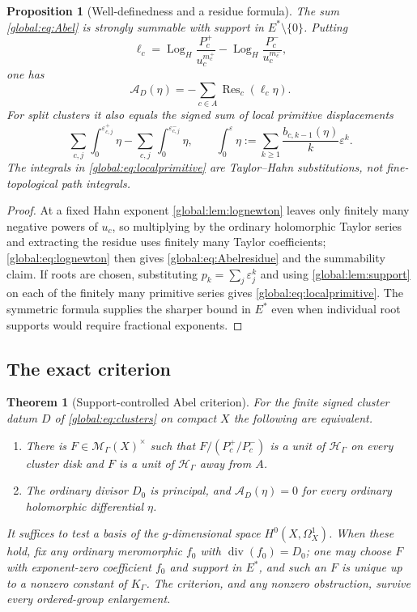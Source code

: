 \documentclass[11pt,letterpaper]{article}
\newtheorem{theorem}{Theorem}[section]
\newtheorem{proposition}[proposition]{Proposition}
\theoremstyle{definition}
\theoremstyle{remark}
\newcommand{\HH}{\mathscr H_\Gamma}
\newcommand{\KK}{K_\Gamma}
\newcommand{\LogH}{\operatorname{Log}_{H}}
\newcommand{\MG}{\mathscr M_\Gamma}
\newcommand{\Res}{\operatorname{Res}}
\numberwithin{equation}{section}
\begin{document}
\begin{proposition}[Well-definedness and a residue formula]\label{global:prop:abelresidue}
The sum \eqref{global:eq:Abel} is strongly summable with support in $E^*\setminus\{0\}$. Putting
\[
  \ell_c=\LogH\frac{P_c^+}{u_c^{m_c^+}}-\LogH\frac{P_c^-}{u_c^{m_c^-}},
\]
one has
\begin{equation}\label{global:eq:Abelresidue}
  \mathcal A_D(\eta)=-\sum_{c\in A}\Res_c(\ell_c\eta).
\end{equation}
For split clusters it also equals the signed sum of local primitive displacements
\begin{equation}\label{global:eq:localprimitive}
  \sum_{c,j}\int_0^{\varepsilon^+_{c,j}}\eta-\sum_{c,j}\int_0^{\varepsilon^-_{c,j}}\eta,
  \qquad
  \int_0^\varepsilon\eta:=\sum_{k\ge1}\frac{b_{c,k-1}(\eta)}{k}\varepsilon^k .
\end{equation}
\emph{The integrals in \eqref{global:eq:localprimitive} are Taylor--Hahn substitutions, not fine-topological path integrals.}
\end{proposition}

\begin{proof}
At a fixed Hahn exponent \cref{global:lem:lognewton} leaves only finitely many negative powers of $u_c$, so multiplying by the ordinary holomorphic Taylor series and extracting the residue uses finitely many Taylor coefficients; \eqref{global:eq:lognewton} then gives \eqref{global:eq:Abelresidue} and the summability claim. If roots are chosen, substituting $p_k=\sum_j\varepsilon_j^k$ and using \cref{global:lem:support} on each of the finitely many primitive series gives \eqref{global:eq:localprimitive}. The symmetric formula supplies the sharper bound in $E^*$ even when individual root supports would require fractional exponents.
\end{proof}

\subsection{The exact criterion}

\begin{theorem}[Support-controlled Abel criterion]\label{global:thm:abelcompact}
For the finite signed cluster datum $D$ of \eqref{global:eq:clusters} on compact $X$ the following are equivalent.
\begin{enumerate}[label=\textup{(\roman*)},leftmargin=2.7em]
\item There is $F\in\MG(X)^\times$ such that $F\bigl/(P_c^+/P_c^-)$ is a unit of $\HH$ on every cluster disk and $F$ is a unit of $\HH$ away from $A$.
\item The ordinary divisor $D_0$ is principal, and $\mathcal A_D(\eta)=0$ for every ordinary holomorphic differential $\eta$.
\end{enumerate}
It suffices to test a basis of the $g$-dimensional space $H^0(X,\Omega^1_X)$. When these hold, fix any ordinary meromorphic $f_0$ with $\operatorname{div}(f_0)=D_0$; one may choose $F$ with exponent-zero coefficient $f_0$ and support in $E^*$, and such an $F$ is unique up to a nonzero constant of $\KK$. The criterion, and any nonzero obstruction, survive every ordered-group enlargement.
\end{theorem}
\end{document}
